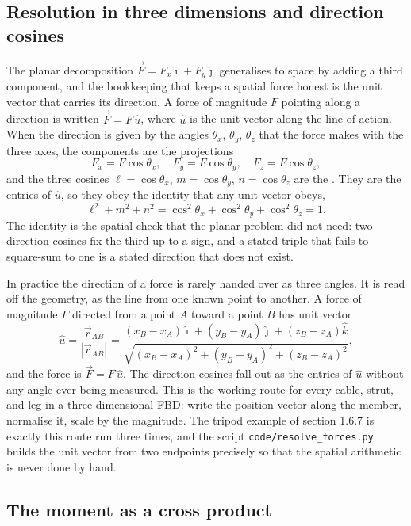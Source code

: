\subsection{Resolution in three dimensions and direction cosines}

The planar decomposition $\vec{F} = F_x\hat{\imath} + F_y\hat{\jmath}$
generalises to space by adding a third component, and the bookkeeping that
keeps a spatial force honest is the unit vector that carries its direction.
A force of magnitude $F$ pointing along a direction is written
$\vec{F} = F\,\hat{u}$, where $\hat{u}$ is the unit vector along the line of
action. When the direction is given by the angles $\theta_x$, $\theta_y$,
$\theta_z$ that the force makes with the three axes, the components are the
projections
\[
F_x = F\cos\theta_x, \quad F_y = F\cos\theta_y, \quad F_z = F\cos\theta_z,
\]
and the three cosines $\ell = \cos\theta_x$, $m = \cos\theta_y$,
$n = \cos\theta_z$ are the . They are the
entries of $\hat{u}$, so they obey the identity that any unit vector obeys,
\[
\ell^2 + m^2 + n^2 = \cos^2\theta_x + \cos^2\theta_y + \cos^2\theta_z = 1.
\]
The identity is the spatial check that the planar problem did not need:
two direction cosines fix the third up to a sign, and a stated triple that
fails to square-sum to one is a stated direction that does not exist.



In practice the direction of a force is rarely handed over as three angles.
It is read off the geometry, as the line from one known point to another.
A force of magnitude $F$ directed from a point $A$ toward a point $B$ has
unit vector
\[
\hat{u} = \frac{\vec{r}_{AB}}{|\vec{r}_{AB}|}
= \frac{(x_B - x_A)\hat{\imath} + (y_B - y_A)\hat{\jmath}
+ (z_B - z_A)\hat{k}}{\sqrt{(x_B - x_A)^2 + (y_B - y_A)^2 + (z_B - z_A)^2}},
\]
and the force is $\vec{F} = F\,\hat{u}$. The direction cosines fall out as
the entries of $\hat{u}$ without any angle ever being measured. This is the
working route for every cable, strut, and leg in a three-dimensional FBD:
write the position vector along the member, normalise it, scale by the
magnitude. The tripod example of section 1.6.7 is exactly this route run
three times, and the script \texttt{code/resolve\_forces.py} builds the
unit vector from two endpoints precisely so that the spatial arithmetic is
never done by hand.

\subsection{The moment as a cross product}

